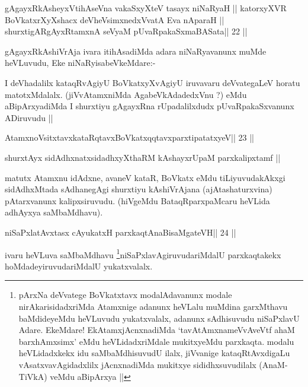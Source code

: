 \begin{shl}
gAgayxRkAsheyxVtihAseVna vakaSxyXteV tasayx niNaRyaH ||
katorxyXVR BoVkatxrXyXshacx deVheV\s simxnedxVvatA Eva nAparaH ||
shurxtigARgAyxRtamxnA seVyaM pUvaRpakaSxmaBASata\hfill || 22 ||
\end{shl}

\begin{artha}
gAgayxRkAshiVrAja ivara itihAsadiMda adara niNaRyavanunx muMde heVLuvudu, Eke  niNaRyisabeVkeMdare:-
\end{artha} 
 
\begin{artha}
I deVhadalilx kataqRvAgiyU BoVkatxyXvAgiyU iruvavaru deVvategaLeV horatu matotxMdalalx. (jiVvAtamxniMda AgabeVkAdadedxVnu ?) eMdu aBipArxyadiMda I shurxtiyu gAgayxRna rUpadalilxdudx pUvaRpakaSxvanunx ADiruvudu ||
\end{artha}

\begin{shl}
AtamxnoV\s sitxtavxkataRqtavxBoVkatxqqtavxparxtipatatxyeV\hfill || 23 ||
\end{shl}

\begin{shl}
shurxtAyx sidAdhxnatxsidadhxyXthaRM kAshayxrUpaM parxkalipxtamf ||
\end{shl}

\begin{artha}
matutx Atamxnu idAdxne, avaneV kataR, BoVkatx eMdu tiLiyuvudakAkxgi sidAdhxMtada sAdhanegAgi shurxtiyu kAshiVrAjana (ajAtashaturxvina) pAtarxvanunx kalipxsiruvudu. (hiVgeMdu BataqRparxpaMcaru heVLida adhAyxya saMbaMdhavu).
\end{artha} 
 

\begin{shl}
niSaPxlatAvxtasx cAyukatxH parxkaqtAnaBisaMgateVH\hfill || 24 ||
\end{shl}

\begin{artha}
ivaru heVLuva saMbaMdhavu \footnote[1]{pArxNa deVvatege BoVkatxtavx 
modalAdavanunx modale nirAkarisidadxriMda Atamxnige adanunx heVLalu 
muMdina garxMthavu baMdideyeMdu heVLuvudu yukatxvalalx, adanunx sAdhisuvudu niSaPxlavU Adare. EkeMdare! EkAtamxjAcnxnadiMda `tavAtAmxnameVvAveVtf ahaM barxhAmxsimx' eMdu heVLidadxriMdale mukitxyeMdu parxkaqta. modalu heVLidadxkekx idu saMbaMdhisuvudU ilalx, jiVvanige kataqRtAvxdigaLu vAsatxvavAgidadxlilx jAcnxnadiMda mukitxye sididhxsuvudilalx (AnaM-TiVkA) veMdu aBipArxya ||
}niSaPxlavAgiruvudariMdalU parxkaqtakekx hoMdadeyiruvudariMdalU yukatxvalalx.
\end{artha}

